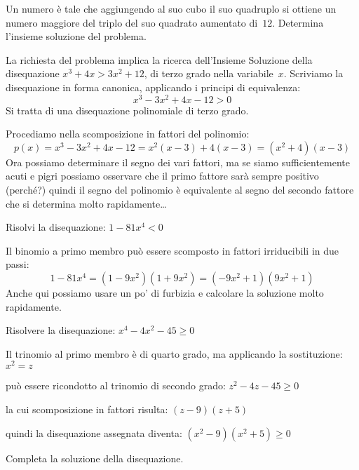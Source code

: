 \begin{esempio}{}{}
Un numero è tale che aggiungendo al suo cubo il suo quadruplo si ottiene 
un numero maggiore del triplo del suo quadrato aumentato di~\(12\). Determina 
l'insieme soluzione del problema.

La richiesta del problema implica la ricerca dell'Insieme Soluzione della 
disequazione \(x^3+4x>3x^2+12\), di terzo grado nella variabile~\(x\). 
Scriviamo la disequazione in forma canonica, applicando i principi di 
equivalenza: 
\[x^3-3x^2+4x-12>0\] 
Si tratta di una disequazione polinomiale di terzo grado.

Procediamo nella scomposizione in fattori del polinomio:
\[p(x)=x^3-3x^2+4x-12 = x^2 \left(x-3\right)+4 \left(x-3\right) =
      \left(x^2+4\right) \left(x-3\right)\]
Ora possiamo determinare il segno dei vari fattori, ma se siamo 
sufficientemente acuti e pigri possiamo osservare che il primo fattore sarà 
sempre positivo (perché?) quindi il segno del polinomio è equivalente al 
segno del secondo fattore che si determina molto rapidamente\dots
\end{esempio}

\begin{esempio}{}{}
Risolvi la disequazione: \(1-81x^4<0\)

Il binomio a primo membro può essere scomposto in fattori irriducibili in due 
passi:
\[1-81x^4 = \left(1-9x^2\right)\left(1+9x^2\right)=
  \left(-9x^2+1\right)\left(9x^2+1\right)\]
Anche qui possiamo usare un po' di furbizia e calcolare la soluzione molto 
rapidamente.
\end{esempio}

\begin{esempio}{}{}
Risolvere la disequazione: \(x^4-4x^2-45 \geqslant 0\)

Il trinomio al primo membro è di quarto grado, ma applicando la 
sostituzione: 
\(x^2=z\)

può essere ricondotto al trinomio di secondo grado:
\(z^2-4z-45 \geqslant 0\)

la cui scomposizione in fattori risulta:
\(\left(z-9\right)\left(z+5\right)\)

quindi la disequazione assegnata diventa: 
\((x^2-9)(x^2+5) \geqslant 0\)

Completa la soluzione della disequazione.
\end{esempio}

% 


